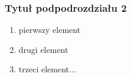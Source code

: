 \documentclass[12px]{article}
\begin{document}
\subsubsection{Tytuł podpodrozdziału 2}
\begin{enumerate}
\item pierwszy element
\item drugi element
\item trzeci element...
\end{enumerate}








\lstlistoflistings
\listoffigures
\end{document}
